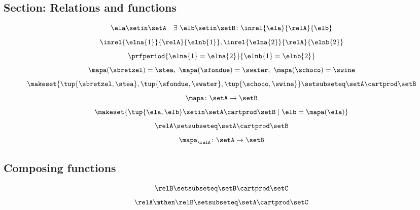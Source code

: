 \begin{forslides}
    \subsection{Section: Relations and functions}

    \begin{equation}\label{eq:slides_session2_99}
        \ela \setin \setA \quad \exists \ \elb \setin \setB\colon  \inrel{\ela}{\relA}{\elb}
    \end{equation}
    \begin{equation}\label{eq:slides_session2_100}
        \inrel{\elna{1}}{\relA}{\elnb{1}}, \inrel{\elna{2}}{\relA}{\elnb{2}}
    \end{equation}
    \begin{equation}\label{eq:slides_session2_101}
        \prfperiod{\elna{1} = \elna{2}}{\elnb{1} = \elnb{2}}
    \end{equation}
    \begin{equation}\label{eq:slides_session2_102}
        \mapa (\sbretzel) = \stea, \ \mapa (\sfondue) = \swater, \ \mapa(\schoco) = \swine
    \end{equation}
    \begin{equation}\label{eq:slides_session2_103}
        \makeset{ \tup{\sbretzel, \stea}, \tup{\sfondue, \swater}, \tup{\schoco, \swine} } \setsubseteq \setA \cartprod \setB
    \end{equation}
    \begin{equation}\label{eq:slides_session2_104}
        \mapa \colon \setA \to \setB
    \end{equation}
    \begin{equation}\label{eq:slides_session2_105}
        \makeset{ \tup{\ela,\elb} \setin \setA \cartprod \setB \mid \elb= \mapa(\ela) }
    \end{equation}
    \begin{equation}\label{eq:slides_session2_106}
        \relA \setsubseteq \setA \cartprod \setB
    \end{equation}
    \begin{equation}\label{eq:slides_session2_107}
        \mapa_\relA \colon \setA \to \setB
    \end{equation}

    \subsection{Composing functions}

    \begin{equation}\label{eq:slides_session2_108}
        \relB \setsubseteq \setB \cartprod \setC
    \end{equation}
    \begin{equation}\label{eq:slides_session2_109}
        \relA \mthen \relB \setsubseteq \setA \cartprod \setC
    \end{equation}


\end{forslides}
